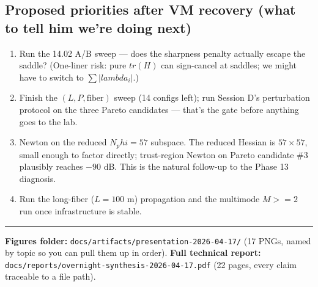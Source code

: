 \documentclass[11pt,letterpaper]{article}
\def\varphi{phi}\def\lambda{lambda}\def\mathrm#1{#1}%
\def\geq{>=}\def\leq{<=}\def\approx{~}%
\begin{document}
\subsection*{Proposed priorities after VM recovery (what to tell him we're doing next)}
\begin{enumerate}[leftmargin=*]
  \item Run the 14.02 A/B sweep --- does the sharpness penalty actually escape the saddle? (One-liner risk: pure $\mathrm{tr}(H)$ can sign-cancel at saddles; we might have to switch to $\sum|\lambda_i|$.)
  \item Finish the $(L, P, \text{fiber})$ sweep (14 configs left); run Session D's perturbation protocol on the three Pareto candidates --- that's the gate before anything goes to the lab.
  \item Newton on the reduced $\mathrm{N}_\varphi = 57$ subspace. The reduced Hessian is $57 \times 57$, small enough to factor directly; trust-region Newton on Pareto candidate \#3 plausibly reaches $-90$ dB. This is the natural follow-up to the Phase 13 diagnosis.
  \item Run the long-fiber ($L = 100$ m) propagation and the multimode $M \geq 2$ run once infrastructure is stable.
\end{enumerate}

\vspace{0.8em}
\hrule
\vspace{0.3em}

\textbf{Figures folder:} \texttt{docs/artifacts/presentation-2026-04-17/} (17 PNGs, named by topic so you can pull them up in order). \textbf{Full technical report:} \texttt{docs/reports/overnight-synthesis-2026-04-17.pdf} (22 pages, every claim traceable to a file path).
\end{document}
